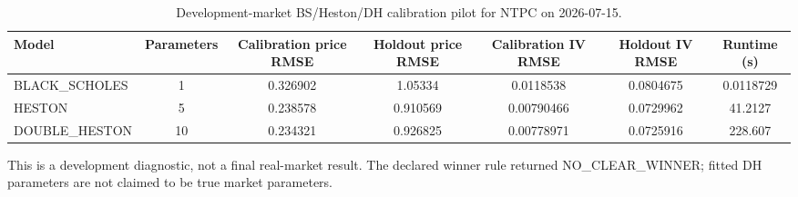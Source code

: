 \begin{table}[htbp]
\centering
\caption{Development-market BS/Heston/DH calibration pilot for NTPC on 2026-07-15.}
\label{tab:real-market-development}
\begin{tabular}{lcccccc}
\toprule
Model & Parameters & Calibration price RMSE & Holdout price RMSE & Calibration IV RMSE & Holdout IV RMSE & Runtime (s) \\
\midrule
BLACK\_SCHOLES & 1 & 0.326902 & 1.05334 & 0.0118538 & 0.0804675 & 0.0118729 \\
HESTON & 5 & 0.238578 & 0.910569 & 0.00790466 & 0.0729962 & 41.2127 \\
DOUBLE\_HESTON & 10 & 0.234321 & 0.926825 & 0.00778971 & 0.0725916 & 228.607 \\
\bottomrule
\end{tabular}
\par\vspace{0.35em}
\begin{minipage}{0.94\linewidth}\small This is a development diagnostic, not a final real-market result. The declared winner rule returned NO\_CLEAR\_WINNER; fitted DH parameters are not claimed to be true market parameters.\end{minipage}
\end{table}
